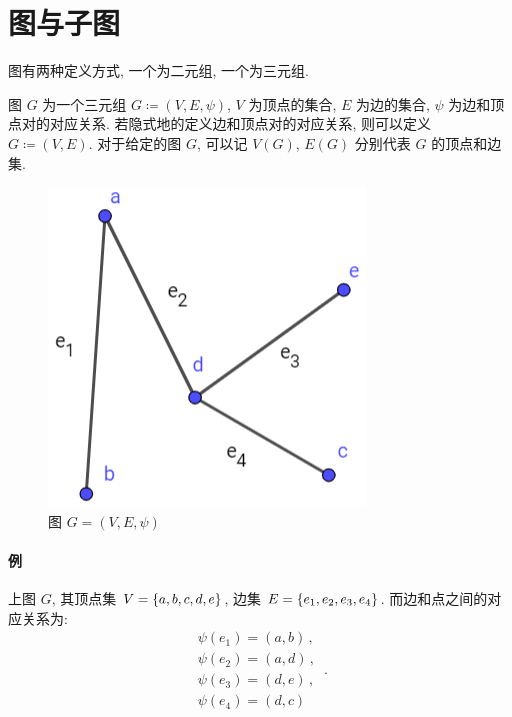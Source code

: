 \documentclass[UTF8]{ctexart}
\theoremstyle{mystyle}
\theoremstyle{myremark}
\theoremstyle{plain}
\DeclarePairedDelimiter\set{\{}{\}}
\begin{document}
\section{图与子图}

图有两种定义方式, 一个为二元组, 一个为三元组.

\begin{definition}[\text{图}]
    图 $ G $ 为一个三元组 $ G \coloneqq (V, E, \psi) $, $ V $ 为顶点的集合, $ E $ 为边的集合, $ \psi $ 为边和顶点对的对应关系. 若隐式地的定义边和顶点对的对应关系, 则可以定义 $ G \coloneqq (V, E) $. 对于给定的图 $ G $, 可以记 $ V(G) $, $ E(G) $ 分别代表 $ G $ 的顶点和边集.
\end{definition}

\begin{figure}[H]
    \centering
    \includegraphics[width = 0.35\linewidth]{./images/graph_definition.png}
    \caption{图 $ G = (V, E, \psi) $}
\end{figure}

\paragraph{例}
上图 $ G $, 其顶点集 $ V = \set{a, b, c, d, e} $, 边集 $ E = \set{e_1, e_2, e_3, e_4} $. 而边和点之间的对应关系为:
\[ \begin{array}{c}
    \psi(e_1) = (a, b) \,,\\
    \psi(e_2) = (a, d) \,,\\
    \psi(e_3) = (d, e) \,,\\
    \psi(e_4) = (d, c)
\end{array} \,.\]
\end{document}
